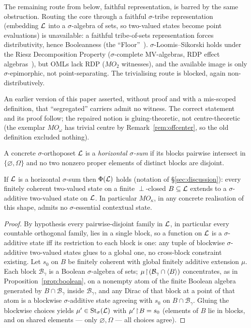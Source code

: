 The remaining route from below, faithful representation, is barred by the same
obstruction. Routing the core through a faithful $\sigma$-tribe
representation (embedding $\mathcal{L}$ into a $\sigma$-algebra of sets, so two-valued states
become point evaluations) is unavailable: a faithful tribe-of-sets representation forces
distributivity, hence Booleanness (the ``Floor''~\cite{PtakPulmannova1991}).
$\sigma$-Loomis--Sikorski holds under the Riesz Decomposition Property
($\sigma$-complete MV-algebras, RDP effect algebras~\cite{Dvurecenskij2000}), but
OMLs lack RDP ($MO_2$ witnesses), and the available image is only $\sigma$-epimorphic,
not point-separating. The trivialising route is blocked, again non-distributively.

An earlier version of this paper asserted, without proof and with a mis-scoped
definition, that ``segregated'' carriers admit no witness. The correct statement
and its proof follow; the repaired notion is gluing-theoretic, not
centre-theoretic (the exemplar $MO_\omega$ has trivial centre by
Remark~\ref{rem:offcenter}, so the old definition excluded nothing).

\begin{definition}\label{def:horizontal}
A concrete $\sigma$-orthoposet $\mathcal{L}$ is a \emph{horizontal $\sigma$-sum} if its
blocks pairwise intersect in $\{\varnothing,\Omega\}$ and no two nonzero proper
elements of distinct blocks are disjoint.
\end{definition}

\begin{lemma}\label{lem:horizontal}
If $\mathcal{L}$ is a horizontal $\sigma$-sum then $\Phi(\mathcal{L})$ holds
(notation of \S\ref{sec:discussion}): every finitely coherent two-valued state on
a finite $\perp$-closed $B\subseteq\mathcal{L}$ extends to a $\sigma$-additive two-valued
state on $\mathcal{L}$. In particular $MO_\kappa$, in any concrete realisation of this
shape, admits no $\sigma$-essential contextual state.
\end{lemma}

\begin{proof}
By hypothesis every pairwise-disjoint family in $\mathcal{L}$, in particular every
countable orthogonal family, lies in a single block, so a function on $\mathcal{L}$ is a
$\sigma$-additive state iff its restriction to each block is one: any tuple of
blockwise $\sigma$-additive two-valued states glues to a global one, no
cross-block constraint existing. Let $s_0$ on $B$ be finitely coherent with
global finitely additive extension $\mu$. Each block $\mathcal B_\gamma$ is a
Boolean $\sigma$-algebra of sets; $\mu\!\restriction\!(\mathcal B_\gamma\cap\langle
B\rangle)$ concentrates, as in Proposition~\ref{prop:boolean}, on a nonempty atom
of the finite Boolean algebra generated by $B\cap\mathcal B_\gamma$ inside
$\mathcal B_\gamma$, and any Dirac of that block at a point of that atom is a
blockwise $\sigma$-additive state agreeing with $s_0$ on $B\cap\mathcal B_\gamma$.
Gluing the blockwise choices yields $\mu'\in\mathrm{St}_\sigma(\mathcal{L})$ with
$\mu'\!\restriction\! B=s_0$ (elements of $B$ lie in blocks, and on shared elements
--- only $\varnothing,\Omega$ --- all choices agree).
\end{proof}

